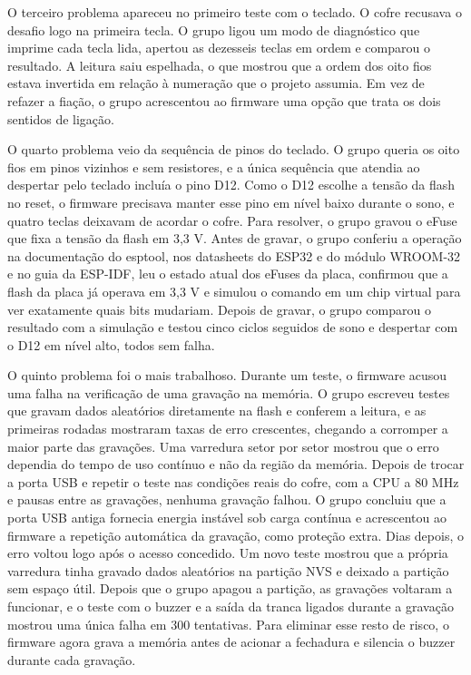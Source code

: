 \documentclass[11pt,a4paper]{article}
\begin{document}
O terceiro problema apareceu no primeiro teste com o teclado. O cofre recusava o desafio logo na primeira tecla. O grupo ligou um modo de diagnóstico que imprime cada tecla lida, apertou as dezesseis teclas em ordem e comparou o resultado. A leitura saiu espelhada, o que mostrou que a ordem dos oito fios estava invertida em relação à numeração que o projeto assumia. Em vez de refazer a fiação, o grupo acrescentou ao firmware uma opção que trata os dois sentidos de ligação.

O quarto problema veio da sequência de pinos do teclado. O grupo queria os oito fios em pinos vizinhos e sem resistores, e a única sequência que atendia ao despertar pelo teclado incluía o pino D12. Como o D12 escolhe a tensão da flash no reset, o firmware precisava manter esse pino em nível baixo durante o sono, e quatro teclas deixavam de acordar o cofre. Para resolver, o grupo gravou o eFuse que fixa a tensão da flash em 3,3 V. Antes de gravar, o grupo conferiu a operação na documentação do esptool, nos datasheets do ESP32 e do módulo WROOM-32 e no guia da ESP-IDF, leu o estado atual dos eFuses da placa, confirmou que a flash da placa já operava em 3,3 V e simulou o comando em um chip virtual para ver exatamente quais bits mudariam. Depois de gravar, o grupo comparou o resultado com a simulação e testou cinco ciclos seguidos de sono e despertar com o D12 em nível alto, todos sem falha.

O quinto problema foi o mais trabalhoso. Durante um teste, o firmware acusou uma falha na verificação de uma gravação na memória. O grupo escreveu testes que gravam dados aleatórios diretamente na flash e conferem a leitura, e as primeiras rodadas mostraram taxas de erro crescentes, chegando a corromper a maior parte das gravações. Uma varredura setor por setor mostrou que o erro dependia do tempo de uso contínuo e não da região da memória. Depois de trocar a porta USB e repetir o teste nas condições reais do cofre, com a CPU a 80 MHz e pausas entre as gravações, nenhuma gravação falhou. O grupo concluiu que a porta USB antiga fornecia energia instável sob carga contínua e acrescentou ao firmware a repetição automática da gravação, como proteção extra. Dias depois, o erro voltou logo após o acesso concedido. Um novo teste mostrou que a própria varredura tinha gravado dados aleatórios na partição NVS e deixado a partição sem espaço útil. Depois que o grupo apagou a partição, as gravações voltaram a funcionar, e o teste com o buzzer e a saída da tranca ligados durante a gravação mostrou uma única falha em 300 tentativas. Para eliminar esse resto de risco, o firmware agora grava a memória antes de acionar a fechadura e silencia o buzzer durante cada gravação.
\end{document}

